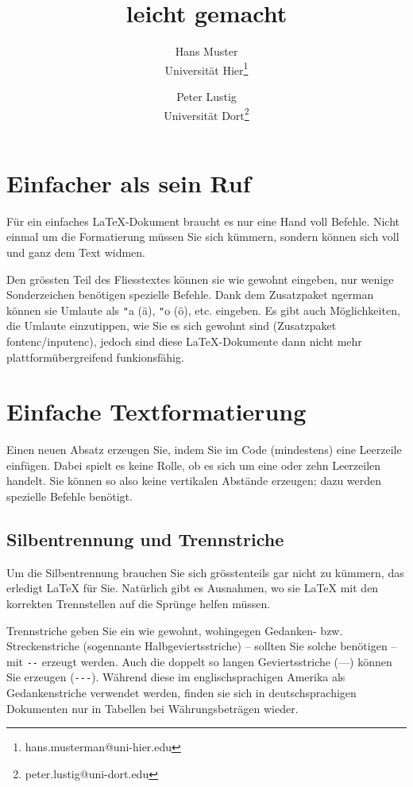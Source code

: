 \documentclass[11pt, a4paper]{article}
\title{\ltx{} leicht gemacht}
\author{Hans Muster\\ Universität Hier\thanks{hans.musterman@uni-hier.edu} \and Peter Lustig\\Universität Dort\thanks{peter.lustig@uni-dort.edu}}
\newcommand{\ltx}{\LaTeX}
\begin{document}
\maketitle
\tableofcontents
\newpage

\section{Einfacher als sein Ruf}

Für ein einfaches \ltx-Dokument braucht es nur eine Hand voll Befehle. Nicht einmal um die Formatierung müssen Sie sich kümmern, sondern können sich voll und ganz dem Text widmen.

Den grössten Teil des Fliesstextes können sie wie gewohnt eingeben, nur wenige Sonderzeichen benötigen spezielle Befehle. Dank dem Zusatzpaket ngerman können sie Umlaute als \verb+"+a (ä), \verb+"+o (ö), etc. eingeben. Es gibt auch Möglichkeiten, die Umlaute einzutippen, wie Sie es sich gewohnt sind (Zusatzpaket fontenc/inputenc), jedoch sind diese \ltx-Dokumente dann nicht mehr plattformübergreifend funkionsfähig.

\section{Einfache Textformatierung}

Einen neuen Absatz erzeugen Sie, indem Sie im Code (mindestens) eine Leerzeile einfügen. Dabei spielt es keine Rolle, ob es sich um eine oder zehn Leerzeilen handelt. Sie können so also keine vertikalen Abstände erzeugen; dazu werden spezielle Befehle benötigt.

\subsection{Silbentrennung und Trennstriche}

Um die Silbentrennung brauchen Sie sich grösstenteils gar nicht zu kümmern, das erledigt \ltx{} für Sie. Natürlich gibt es Ausnahmen, wo sie \ltx{} mit den korrekten Trennstellen auf die Sprünge helfen müssen.

Trennstriche geben Sie ein wie gewohnt, wohingegen Gedanken- bzw. Streckenstriche (sogennante Halbgeviertsstriche) -- sollten Sie solche benötigen -- mit \verb+--+ erzeugt werden. Auch die doppelt so langen Geviertsstriche (---) können Sie erzeugen (\verb+---+). Während diese im englischsprachigen Amerika als Gedankenstriche verwendet werden, finden sie sich in deutschsprachigen Dokumenten nur in Tabellen bei Währungsbeträgen wieder.
\end{document}
